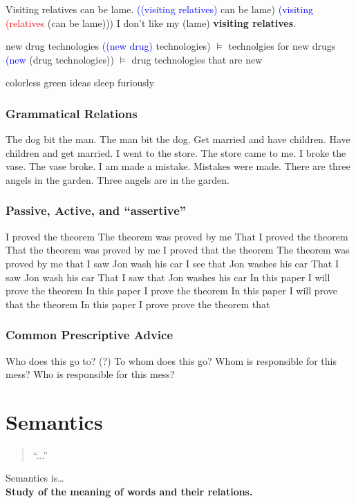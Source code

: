 \documentclass{article}
\begin{document}
\pex \a Visiting relatives can be lame.
\a \textcolor{blue}{((visiting relatives)} can be lame)
\a \textcolor{blue}{(visiting} \textcolor{red}{(relatives} (can be lame)))
\a I don't like my (lame) {\bf visiting relatives}.
\xe

\pex \a new drug technologies
\a \textcolor{blue}{((new drug)} technologies)
\a $\models$ technolgies for new drugs
\a \textcolor{blue}{(new} (drug technologies))
\a $\models$ drug technologies that are new
\xe

\ex colorless green ideas sleep furiously \xe

\subsubsection{Grammatical Relations}
\pex \a The dog bit the man.
\a The man bit the dog.
\a Get married and have children.
\a Have children and get married.
\a I went to the store.
\a The store came to me.
\a I broke the vase.
\a The vase broke.
\a I am made a mistake.
\a Mistakes were made.
\a There are three angels in the garden.
\a Three angels are in the garden.
\xe

\subsubsection{Passive, Active, and ``assertive''}
\pex \a I proved the theorem
\a The theorem was proved by me
\a That I proved the theorem
\a That the theorem was proved by me
\a I proved that the theorem
\a The theorem was proved by me that
\a I saw Jon wash his car
\a I see that Jon washes his car
\a That I saw Jon wash his car
\a That I saw that Jon washes his car
\a In this paper I will prove the theorem
\a In this paper I prove the theorem
\a In this paper I will prove that the theorem
\a In this paper I prove prove the theorem that
\xe

\subsubsection{Common Prescriptive Advice}
\pex \a Who does this go to?
\a (?) To whom does this go?
\a Whom is responsible for this mess? 
\a Who is responsible for this mess?
\xe

\section{Semantics}
\begin{quote}
``...''
\end{quote}
\begin{center}
Semantics is\ldots \\
{\bf Study of the meaning of words and their relations.}
\end{center}
\end{document}
